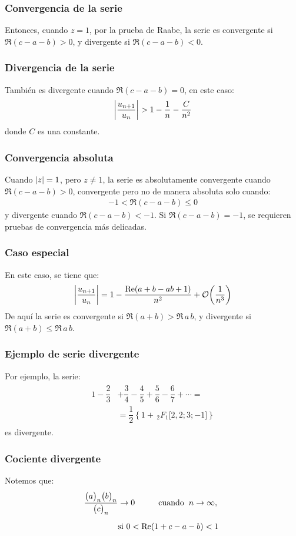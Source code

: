 \documentclass[12pt]{beamer}
\begin{document}
\begin{frame}
\frametitle{Convergencia de la serie}
Entonces, cuando $z = 1$, por la prueba de Raabe, la serie es convergente si $\Re (c - a - b) > 0$, y divergente si $\Re (c - a - b) < 0$.
\end{frame}
\begin{frame}
\frametitle{Divergencia de la serie}
También es divergente cuando $\Re (c - a - b) = 0$, en este caso:
\pause
\begin{align*}
\abs{\dfrac{u_{n+1}}{u_{n}}} > 1 - \dfrac{1}{n} - \dfrac{C}{n^{2}}
\end{align*}
donde $C$ es una constante.
\end{frame}
\begin{frame}
\frametitle{Convergencia absoluta}
Cuando $\abs{z} = 1$, pero $z \neq 1$, la serie es absolutamente convergente cuando $\Re (c - a - b) > 0$, convergente pero no de manera absoluta solo cuando:
\pause
\begin{align*}
- 1 < \Re (c - a - b) \leq 0
\end{align*}
\pause
y divergente cuando $\Re (c - a - b) < -1$. \pause Si $\Re (c - a - b) = -1$, se requieren pruebas de convergencia más delicadas.
\end{frame}
\begin{frame}
\frametitle{Caso especial}
En este caso, se tiene que:
\pause
\begin{align}
\abs{\dfrac{u_{n+1}}{u_{n}}} = 1 - \dfrac{\Re (a + b - a b + 1)}{n^{2}} + \order{\dfrac{1}{n^{3}}}
\label{eq:ecuacion_01_01_01_15}
\end{align}
\pause
De aquí la serie es convergente si $\Re (a + b) > \Re \, a \, b$, y divergente si $\Re (a + b) \leq \Re \, a \, b$.
\end{frame}
\begin{frame}
\frametitle{Ejemplo de serie divergente}
Por ejemplo, la serie:
\pause
\begin{align}
\begin{aligned}
1 - \dfrac{2}{3} &+ \dfrac{3}{4} - \dfrac{4}{5} + \dfrac{5}{6} - \dfrac{6}{7} + \cdots = \\[0.5em]
&= \dfrac{1}{2} \left\{ 1 + \, {}_{2} F_{1} \big[ 2, 2; 3; -1 \big] \right\}
\end{aligned}
\label{eq:ecuacion_01_01_01_16}
\end{align}
es divergente.
\end{frame}
\begin{frame}
\frametitle{Cociente divergente}
Notemos que:
\pause
\begin{align}
\begin{aligned}
\dfrac{\big( a \big)_{n} \big( b \big)_{n}}{\big( c \big)_{n}} &\to 0 \hspace{1cm} \mbox{cuando} \hspace{0.2cm} n \to \infty, \hspace{0.2cm} \\[0.5em]
&\mbox{si } 0 < \Re (1 + c - a - b) < 1
\end{aligned}
\label{eq:ecuacion_01_01_01_17}
\end{align}
\end{frame}
\end{document}
